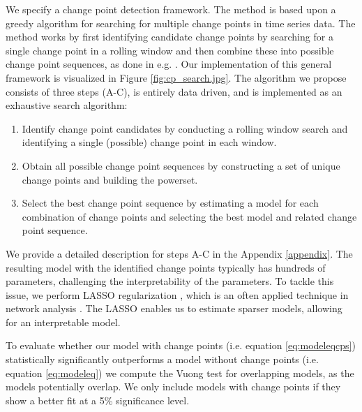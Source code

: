 We specify a change point detection framework. The method is based upon a greedy algorithm for searching for multiple change points in time series data. The method works by first identifying candidate change points by searching for a single change point in a rolling window and then combine these into possible change point sequences, as done in e.g. \textcite{bai2023multiple}. Our implementation of this general framework is visualized in Figure \ref{fig:cp_search.jpg}. The algorithm we propose consists of three steps (A-C), is entirely data driven, and is implemented as an exhaustive search algorithm:
\begin{enumerate}[label=Step \Alph*:]
	\item Identify change point candidates by conducting a rolling window search and identifying a single (possible) change point in each window.
	\item Obtain all possible change point sequences by constructing a set of unique change points and building the powerset.
	\item Select the best change point sequence by estimating a model for each combination of change points and selecting the best model and related change point sequence.
\end{enumerate} 
We provide a detailed description for steps A-C in the Appendix \ref{appendix}. The resulting model with the identified change points typically has hundreds of parameters, challenging the interpretability of the parameters. To tackle this issue, we perform LASSO regularization \citep{tibshirani_regression_1996}, which is an often applied technique in network analysis \citep{Barigozzi2019, Trimborn2022a, Trimborn2022, Zhang2023}. The LASSO enables us to estimate sparser models, allowing for an interpretable model. 

To evaluate whether our model with change points (i.e. equation \eqref{eq:modeleqcps}) statistically significantly outperforms a model without change points (i.e. equation \eqref{eq:modeleq}) we compute the Vuong test \citep{Vuong1989} for overlapping models, as the models potentially overlap. We only include models with change points if they show a better fit at a 5\% significance level. 

